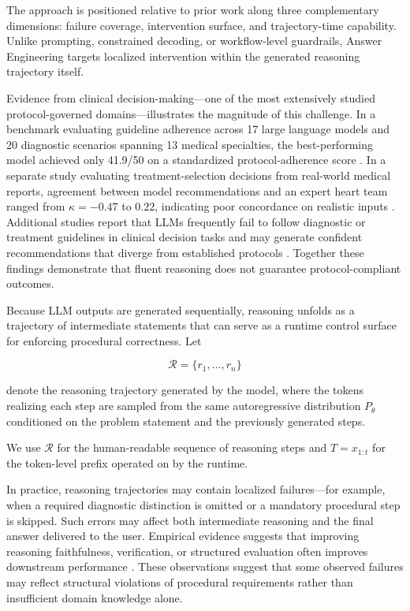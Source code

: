 \documentclass[twocolumn]{article}
\begin{document}
The approach is positioned relative to prior work along three complementary
dimensions: failure coverage, intervention surface, and trajectory-time
capability. Unlike prompting, constrained decoding, or workflow-level
guardrails, Answer Engineering targets localized intervention within the
generated reasoning trajectory itself.

Evidence from clinical decision-making---one of the most extensively studied
protocol-governed domains---illustrates the magnitude of this challenge. In a
benchmark evaluating guideline adherence across 17 large language models and 20
diagnostic scenarios spanning 13 medical specialties, the best-performing model
achieved only 41.9/50 on a standardized protocol-adherence score
\parencite{fast2024amega}. In a separate study evaluating treatment-selection
decisions from real-world medical reports, agreement between model
recommendations and an expert heart team ranged from $\kappa = -0.47$ to $0.22$,
indicating poor concordance on realistic inputs
\parencite{roeschl2025guideline_concordant}. Additional studies report that LLMs
frequently fail to follow diagnostic or treatment guidelines in clinical
decision tasks and may generate confident recommendations that diverge from
established protocols \parencite{hager2024limitations_clinical_decision}.
Together these findings demonstrate that fluent reasoning does not guarantee
protocol-compliant outcomes.

Because LLM outputs are generated sequentially, reasoning unfolds as a
trajectory of intermediate statements that can serve as a runtime control
surface for enforcing procedural correctness. Let

\[
  \mathcal{R} = \{ r_1, \dots, r_n \}
\]

denote the reasoning trajectory generated by the model, where the tokens realizing each step are sampled from the same autoregressive
distribution $P_\theta$ conditioned on the
problem statement and the previously generated steps.

We use $\mathcal{R}$ for the human-readable sequence of reasoning steps and
$T=x_{1:t}$ for the token-level prefix operated on by the runtime.

In practice, reasoning trajectories may contain localized failures---for example,
when a required diagnostic distinction is omitted or a mandatory procedural step
is skipped. Such errors may affect both intermediate reasoning and the final
answer delivered to the user. Empirical evidence suggests that improving
reasoning faithfulness, verification, or structured evaluation often improves
downstream performance
\parencite{lyu2023faithfulcot,paul2024makingreasoningmatter,yun2025medprm}.
These observations suggest that some observed failures may reflect structural
violations of procedural requirements rather than insufficient domain knowledge
alone.
\end{document}
